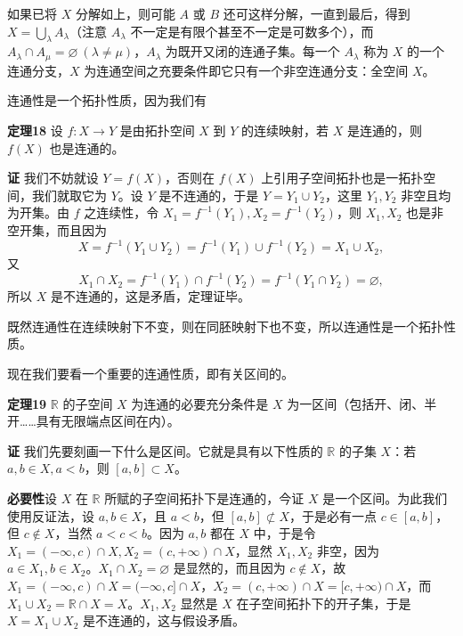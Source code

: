 如果已将 $X$ 分解如上，则可能 $A$ 或 $B$ 还可这样分解，一直到最后，得到 $X=\bigcup_\lambda A_\lambda$（注意 $A_\lambda$ 不一定是有限个甚至不一定是可数多个），而 $A_\lambda\cap A_\mu=\varnothing\ (\lambda\ne\mu)$，$A_\lambda$ 为既开又闭的连通子集。每一个 $A_\lambda$ 称为 $X$ 的一个连通分支，$X$ 为连通空间之充要条件即它只有一个非空连通分支：全空间 $X$。

连通性是一个拓扑性质，因为我们有

\noindent\textbf{定理18}\quad
设 $f:X\to Y$ 是由拓扑空间 $X$ 到 $Y$ 的连续映射，若 $X$ 是连通的，则 $f(X)$ 也是连通的。

\noindent\textbf{证}\quad
我们不妨就设 $Y=f(X)$，否则在 $f(X)$ 上引用子空间拓扑也是一拓扑空间，我们就取它为 $Y$。设 $Y$ 是不连通的，于是 $Y=Y_1\cup Y_2$，这里 $Y_1,Y_2$ 非空且均为开集。由 $f$ 之连续性，令 $X_1=f^{-1}(Y_1),X_2=f^{-1}(Y_2)$，则 $X_1,X_2$ 也是非空开集，而且因为
\[
 X=f^{-1}(Y_1\cup Y_2)=f^{-1}(Y_1)\cup f^{-1}(Y_2)=X_1\cup X_2,
\]
又
\[
 X_1\cap X_2=f^{-1}(Y_1)\cap f^{-1}(Y_2)=f^{-1}(Y_1\cap Y_2)=\varnothing,
\]
所以 $X$ 是不连通的，这是矛盾，定理证毕。

既然连通性在连续映射下不变，则在同胚映射下也不变，所以连通性是一个拓扑性质。

现在我们要看一个重要的连通性质，即有关区间的。

\noindent\textbf{定理19}\quad
$\mathbb R$ 的子空间 $X$ 为连通的必要充分条件是 $X$ 为一区间（包括开、闭、半开……具有无限端点区间在内）。

\noindent\textbf{证}\quad
我们先要刻画一下什么是区间。它就是具有以下性质的 $\mathbb R$ 的子集 $X$：若 $a,b\in X,a<b$，则 $[a,b]\subset X$。

\textbf{必要性}\quad 设 $X$ 在 $\mathbb R$ 所赋的子空间拓扑下是连通的，今证 $X$ 是一个区间。为此我们使用反证法，设 $a,b\in X$，且 $a<b$，但 $[a,b]\not\subset X$，于是必有一点 $c\in[a,b]$，但 $c\notin X$，当然 $a<c<b$。因为 $a,b$ 都在 $X$ 中，于是令 $X_1=(-\infty,c)\cap X,X_2=(c,+\infty)\cap X$，显然 $X_1,X_2$ 非空，因为 $a\in X_1,b\in X_2$。$X_1\cap X_2=\varnothing$ 是显然的，而且因为 $c\notin X$，故 $X_1=(-\infty,c)\cap X=(-\infty,c]\cap X$，$X_2=(c,+\infty)\cap X=[c,+\infty)\cap X$，而 $X_1\cup X_2=\mathbb R\cap X=X$。$X_1,X_2$ 显然是 $X$ 在子空间拓扑下的开子集，于是 $X=X_1\cup X_2$ 是不连通的，这与假设矛盾。

